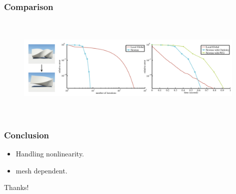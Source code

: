 \documentclass[serif,mathserif]{beamer}
\begin{document}

\begin{frame}
  \frametitle{Comparison}
  \begin{figure}[t]
  \centering
  \includegraphics[height=5cm,width=11cm]{pic/comparison.png}
  \end{figure}
\end{frame}
  
\begin{frame}
  \frametitle{Conclusion}
  \begin{itemize}
   \item Handling nonlinearity.
   \item mesh dependent.
  \end{itemize}
\end{frame}

\begin{frame} 
 \centering \Huge{Thanks!}
\end{frame}
\end{document}
